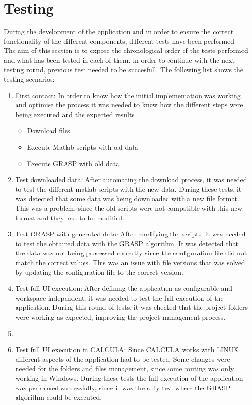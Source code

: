 \section{Testing}
During the development of the application and in order to ensure the correct functionality of the different components, different tests have been performed. The aim of this section is to expose the chronological order of the tests performed and what has been tested in each of them. In order to continue with the next testing round, previous test needed to be succesfull. The following list shows the testing scenarios:
\begin{enumerate}
    \item First contact: In order to know how the initial implementation was working and optimise the process it was needed to know how the different steps were being executed and the expected results
    \begin{itemize}
        \item Download files
        \item Execute Matlab scripts with old data
        \item Execute GRASP with old data
    \end{itemize}
    \item Test downloaded data: After automating the download process, it was needed to test the different matlab scripts with the new data. During these tests, it was detected that some data was being downloaded with a new file format. This was a problem, since the old scripts were not compatible with this new format and they had to be modified. 
    \item Test GRASP with generated data: After modifying the scripts, it was needed to test the obtained data with the GRASP algorithm. It was detected that the data was not being processed correctly since the configuration file did not match the correct values. This was an issue with file versions that was solved by updating the configuration file to the correct version. 
    \item Test full UI execution: After defining the application as configurable and workspace independent, it was needed to test the full execution of the application. During this round of tests, it was checked that the project folders were working as expected, improving the project management process.
    \item \item Test full UI execution in CALCULA: Since CALCULA works with LINUX different aspects of the application had to be tested. Some changes were needed for the folders and files management, since some routing was only working in Windows. During these tests the full execution of the application was performed successfully, since it was the only test where the GRASP algorithm could be executed.

\end{enumerate}

